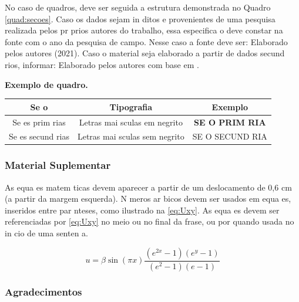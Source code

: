 \documentclass{article}
\begin{document}

No caso de quadros, deve ser seguida a estrutura demonstrada no Quadro \ref{quad:secoes}. Caso os dados sejam in ditos e provenientes de uma pesquisa realizada pelos pr prios autores do trabalho, essa especifica o deve constar na fonte com o ano da pesquisa de campo. Nesse caso a fonte deve ser: Elaborado pelos autores (2021). Caso o material seja elaborado a partir de dados secund rios, informar: Elaborado pelos autores com base em \cite{IBGE2017}.


\begin{quadro}
\centering%
\textbf{Exemplo de quadro.}\\%
\begin{tabular}{| c | c | c |}
\hline
\textbf{Se o}    & \textbf{Tipografia}    & \textbf{Exemplo}     \\
\hline
Se es prim rias & Letras mai sculas em negrito    & \textbf{SE O PRIM RIA}   \\
\hline
Se es secund rias & Letras mai sculas sem negrito    & SE O SECUND RIA   \\
\hline
\end{tabular}
\vspace{.15cm}
\label{quad:secoes}
\end{quadro}

\subsubsection{Material Suplementar}
As equa es matem ticas devem aparecer a partir de um deslocamento de 0,6 cm (a partir da margem esquerda). N meros ar bicos devem ser usados em equa es, inseridos entre par nteses, como ilustrado na \cref{eq:Uxy}.
As equa es devem ser referenciadas por \cref{eq:Uxy} no meio ou no final da frase, ou por  quando usada no in cio de uma senten a.

\begin{equation}\label{eq:Uxy}
u = \beta \sin(\pi x)\frac{(e^{2x}-1)(e^y-1)}{(e^2-1)(e-1)}
\end{equation}

\subsubsection{Agradecimentos}
\end{document}
